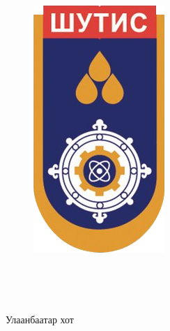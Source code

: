 
\begin{titlepage}
\begin{center}
\pagecolor{CoverBlue}

{\scshape\LARGE \univname\par} %
{\scshape\Large \facname\par}\vspace{0.5cm} %

\begin{figure}[!htbp]
\centering
\includegraphics[scale=0.2]{Figures//MUST_logo.png}
\end{figure}

\vspace{1cm}
\hfill \large{\longname} \\

\vspace{1cm}

{\huge \bfseries \ttitle\par}\vspace{0.4cm} %

\vspace{3cm}
\textsc{\Large {\thesisname}}\\ %

\vfill

\large {Улаанбаатар хот} \\
 
\end{center}
\end{titlepage}
\pagecolor{white}

